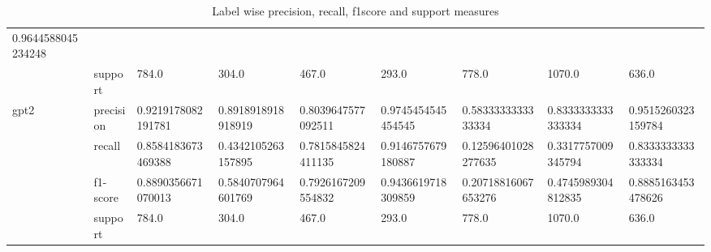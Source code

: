 \begin{landscape}
\begin{table}[]
{\begin{tabular}{@{}lllllllll@{}}
  \multicolumn{1}{l|}{0.9644588045234248} \\ \cmidrule(l){2-9} 
\multicolumn{1}{|l|}{} &
  \multicolumn{1}{l|}{support} &
  \multicolumn{1}{l|}{784.0} &
  \multicolumn{1}{l|}{304.0} &
  \multicolumn{1}{l|}{467.0} &
  \multicolumn{1}{l|}{293.0} &
  \multicolumn{1}{l|}{778.0} &
  \multicolumn{1}{l|}{1070.0} &
  \multicolumn{1}{l|}{636.0} \\ \midrule
\multicolumn{1}{|l|}{\multirow{4}{*}{gpt2}} &
  \multicolumn{1}{l|}{precision} &
  \multicolumn{1}{l|}{0.9219178082191781} &
  \multicolumn{1}{l|}{0.8918918918918919} &
  \multicolumn{1}{l|}{0.8039647577092511} &
  \multicolumn{1}{l|}{0.9745454545454545} &
  \multicolumn{1}{l|}{0.5833333333333334} &
  \multicolumn{1}{l|}{0.8333333333333334} &
  \multicolumn{1}{l|}{0.9515260323159784} \\ \cmidrule(l){2-9} 
\multicolumn{1}{|l|}{} &
  \multicolumn{1}{l|}{recall} &
  \multicolumn{1}{l|}{0.8584183673469388} &
  \multicolumn{1}{l|}{0.4342105263157895} &
  \multicolumn{1}{l|}{0.7815845824411135} &
  \multicolumn{1}{l|}{0.9146757679180887} &
  \multicolumn{1}{l|}{0.12596401028277635} &
  \multicolumn{1}{l|}{0.3317757009345794} &
  \multicolumn{1}{l|}{0.8333333333333334} \\ \cmidrule(l){2-9} 
\multicolumn{1}{|l|}{} &
  \multicolumn{1}{l|}{f1-score} &
  \multicolumn{1}{l|}{0.8890356671070013} &
  \multicolumn{1}{l|}{0.5840707964601769} &
  \multicolumn{1}{l|}{0.7926167209554832} &
  \multicolumn{1}{l|}{0.9436619718309859} &
  \multicolumn{1}{l|}{0.20718816067653276} &
  \multicolumn{1}{l|}{0.4745989304812835} &
  \multicolumn{1}{l|}{0.8885163453478626} \\ \cmidrule(l){2-9} 
\multicolumn{1}{|l|}{} &
  \multicolumn{1}{l|}{support} &
  \multicolumn{1}{l|}{784.0} &
  \multicolumn{1}{l|}{304.0} &
  \multicolumn{1}{l|}{467.0} &
  \multicolumn{1}{l|}{293.0} &
  \multicolumn{1}{l|}{778.0} &
  \multicolumn{1}{l|}{1070.0} &
  \multicolumn{1}{l|}{636.0} \\ \bottomrule
\end{tabular}%
}
\caption{Label wise precision, recall, f1score and support measures}
\label{tab:Per-Label-precision-recall-f-measure}
\end{table}
\end{landscape}

